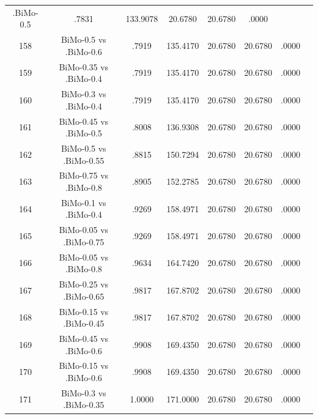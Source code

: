 \documentclass[a4paper,10pt]{article}
\begin{document}
\begin{landscape}
\begin{table}[!htp]
\begin{tabular}{cccccccc}
.BiMo-0.5&.7831&133.9078&20.6780&20.6780&.0000\\158&BiMo-0.5 vs .BiMo-0.6&.7919&135.4170&20.6780&20.6780&.0000\\159&BiMo-0.35 vs .BiMo-0.4&.7919&135.4170&20.6780&20.6780&.0000\\160&BiMo-0.3 vs .BiMo-0.4&.7919&135.4170&20.6780&20.6780&.0000\\161&BiMo-0.45 vs .BiMo-0.5&.8008&136.9308&20.6780&20.6780&.0000\\162&BiMo-0.5 vs .BiMo-0.55&.8815&150.7294&20.6780&20.6780&.0000\\163&BiMo-0.75 vs .BiMo-0.8&.8905&152.2785&20.6780&20.6780&.0000\\164&BiMo-0.1 vs .BiMo-0.4&.9269&158.4971&20.6780&20.6780&.0000\\165&BiMo-0.05 vs .BiMo-0.75&.9269&158.4971&20.6780&20.6780&.0000\\166&BiMo-0.05 vs .BiMo-0.8&.9634&164.7420&20.6780&20.6780&.0000\\167&BiMo-0.25 vs .BiMo-0.65&.9817&167.8702&20.6780&20.6780&.0000\\168&BiMo-0.15 vs .BiMo-0.45&.9817&167.8702&20.6780&20.6780&.0000\\169&BiMo-0.45 vs .BiMo-0.6&.9908&169.4350&20.6780&20.6780&.0000\\170&BiMo-0.15 vs .BiMo-0.6&.9908&169.4350&20.6780&20.6780&.0000\\171&BiMo-0.3 vs .BiMo-0.35&1.0000&171.0000&20.6780&20.6780&.0000\\\hline
\end{tabular}
\end{table}

\end{landscape}
\end{document}
